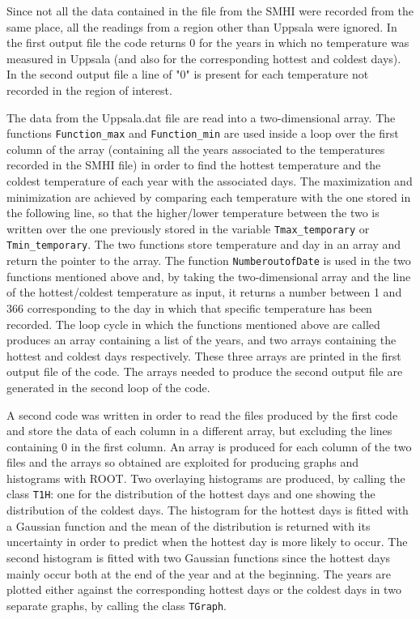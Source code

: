 \documentclass[a4paper]{article}
\begin{document}
Since not all the data contained in the file from the SMHI were recorded from the same place, all the readings from a region other
than Uppsala were ignored. In the first output file the code returns $0$  for the years in which no temperature was measured in
Uppsala (and also for the corresponding hottest and coldest days). In the second output file a line of "$0$" is present for each 
temperature not recorded in the region of interest.

The data from the Uppsala.dat file are read into a two-dimensional array. The functions \texttt{Function{\_}max} and \texttt{Function{\_}min} are used
inside a loop over the first column of the array (containing all the years associated to the temperatures recorded in the 
SMHI file) in order to find the hottest temperature and the coldest temperature of each year with the associated days. The maximization
and minimization are achieved by comparing each temperature with the one stored in the following line, so that the higher/lower temperature between 
the two is written over the one previously stored in the variable \texttt{Tmax\_temporary} or \texttt{Tmin\_temporary}. The two functions store temperature and day in an array and return the pointer to the array. The function \texttt{NumberoutofDate}
is used in the two functions mentioned above and, by taking the two-dimensional array and the line of the hottest/coldest temperature
as input, it returns a number between 1 and 366 corresponding to the day in which that specific temperature has been recorded. 
The loop cycle in which the functions mentioned above are called produces an array containing a list of the years, and two arrays 
containing the hottest and coldest days respectively. These three arrays are printed in the first output file of the code.
The arrays needed to produce the second output file are generated in the second loop of the code.

A second code was written in order to read the files produced by the first code and store the data of each column in a different 
array, but excluding the lines containing $0$ in the first column. An array is produced for each column of the two files and the 
arrays so obtained are exploited for producing graphs and histograms with ROOT.
Two overlaying histograms are produced, by calling the class \texttt{T1H}: one for the distribution of the hottest days and one showing the distribution of the 
coldest days. The histogram for the hottest days is fitted with a Gaussian function and the mean of the distribution is returned with its 
uncertainty in order to predict when the hottest day is more likely to occur. The second histogram is fitted with 
two Gaussian functions since the hottest days mainly occur both at the end of the year and at the beginning. The years are
plotted either against the corresponding hottest days or the coldest days in two separate graphs, by calling the class \texttt{TGraph}. 
\end{document}
